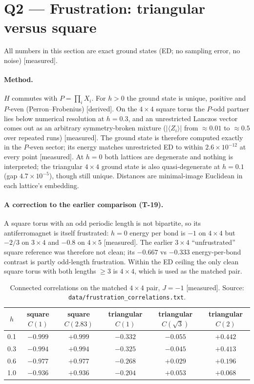 \documentclass[11pt,a4paper]{article}
\newcommand{\tg}[1]{\textsf{\small[#1]}}
\newcommand{\der}{\tg{derived}}
\newcommand{\mea}{\tg{measured}}
\newcommand{\code}[1]{\nolinkurl{#1}}
\begin{document}
\section{Q2 --- Frustration: triangular versus square}\label{sec:q2}

All numbers in this section are exact ground states (ED; no sampling error, no noise) \mea.

\paragraph{Method.} $H$ commutes with $P=\prod_iX_i$. For $h>0$ the ground state is unique, positive and
$P$-even (Perron--Frobenius) \der. On the $4\times4$ square torus the $P$-odd partner lies below numerical
resolution at $h=0.3$, and an unrestricted Lanczos vector comes out as an arbitrary symmetry-broken mixture
($|\langle Z_i\rangle|$ from $\approx0.01$ to $\approx0.5$ over repeated runs) \mea. The ground state is therefore
computed exactly in the $P$-even sector; its energy matches unrestricted ED to within $2.6\times10^{-12}$ at every
point \mea. At $h=0$ both lattices are degenerate and nothing is interpreted; the triangular $4\times4$ ground state
is also quasi-degenerate at $h=0.1$ (gap $4.7\times10^{-5}$), though still unique. Distances are minimal-image
Euclidean in each lattice's embedding.

\paragraph{A correction to the earlier comparison (T-19).} A square torus with an odd periodic length is not
bipartite, so its antiferromagnet is itself frustrated: $h=0$ energy per bond is $-1$ on $4\times4$ but $-2/3$ on
$3\times4$ and $-0.8$ on $4\times5$ \mea. The earlier $3\times4$ ``unfrustrated'' square reference was therefore
not clean; its $-0.667$ vs $-0.333$ energy-per-bond contrast is partly odd-length frustration. Within the ED ceiling
the only clean square torus with both lengths $\ge3$ is $4\times4$, which is used as the matched pair.

\begin{table}[h]\centering\small
\caption{Connected correlations on the matched $4\times4$ pair, $J=-1$ \mea. Source:
\code{data/frustration_correlations.txt}.}\label{tab:q2}
\begin{tabular}{ccc|ccc}
\toprule
$h$ & square $C(1)$ & square $C(2.83)$ & triangular $C(1)$ & triangular $C(\sqrt3)$ & triangular $C(2)$\\
\midrule
0.1 & $-0.999$ & $+0.999$ & $-0.332$ & $-0.055$ & $+0.442$\\
0.3 & $-0.994$ & $+0.994$ & $-0.325$ & $-0.045$ & $+0.413$\\
0.6 & $-0.977$ & $+0.977$ & $-0.268$ & $+0.029$ & $+0.196$\\
1.0 & $-0.936$ & $+0.936$ & $-0.204$ & $+0.053$ & $+0.068$\\
\bottomrule
\end{tabular}
\end{table}
\end{document}
